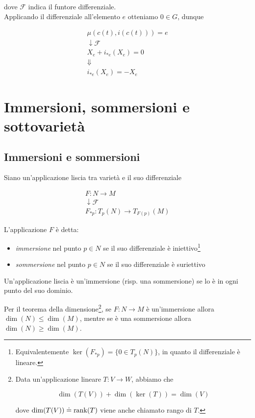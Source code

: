 dove $ \mathcal{F} $ indica il funtore differenziale. \\
Applicando il differenziale all'elemento $ e $ otteniamo $ 0 \in G $, dunque

\begin{gather}
		\mu(c(t),i(c(t))) = e \\
		\downarrow \mathcal{F} \nonumber \\
		X_{e} + i_{*e} (X_{e}) = 0 \\
		\Downarrow \nonumber \\
		i_{*e}(X_{e}) = - X_{e}
\end{gather}

\section{Immersioni, sommersioni e sottovarietà}

\subsection{Immersioni e sommersioni}

Siano un'applicazione liscia tra varietà e il suo differenziale

\begin{gather}
	F : N \to M \\
	\downarrow \mathcal{F} \nonumber \\
	F_{*p} : T_{p}(N) \to T_{F(p)}(M)
\end{gather}

L'applicazione $ F $ è detta:

\begin{itemize}
	\item \textit{immersione} nel punto $ p \in N $ se il suo differenziale è iniettivo\footnote{%
		Equivalentemente $ \ker(F_{*p}) = \{0 \in T_{p}(N)\} $, in quanto il differenziale è lineare.%
	}
	
	\item \textit{sommersione} nel punto $ p \in N $ se il suo differenziale è suriettivo
\end{itemize}

Un'applicazione liscia è un'immersione (risp. una sommersione) se lo è in ogni punto del suo dominio.

\begin{definition}
	Per il teorema della dimensione\footnote{%
		Data un'applicazione lineare $ T : V \to W $, abbiamo che
		
		\begin{equation*}
			\dim(T(V)) + \dim(\ker(T)) = \dim(V)
		\end{equation*}
		
		dove $ \dim(T(V)) \doteq \rank(T) $ viene anche chiamato rango di $ T $.%
	}, se $ F : N \to M $ è un'immersione allora $ \dim(N) \leqslant \dim(M) $, mentre se è una sommersione allora $ \dim(N) \geqslant \dim(M) $.
\end{definition}

